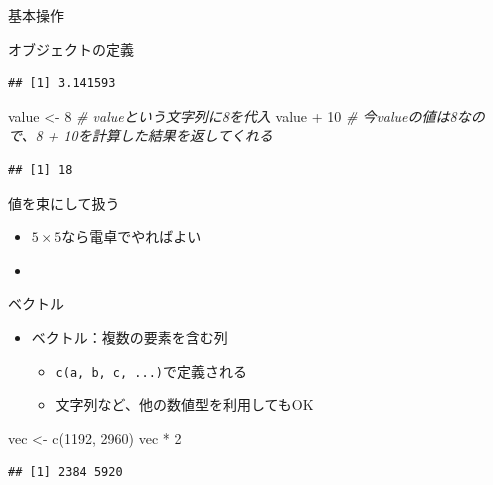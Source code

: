 \documentclass[
  ignorenonframetext,
]{beamer}
\newenvironment{Shaded}{\begin{snugshade}}{\end{snugshade}}
\newcommand{\CommentTok}[1]{\textcolor[rgb]{0.56,0.35,0.01}{\textit{#1}}}
\newcommand{\DecValTok}[1]{\textcolor[rgb]{0.00,0.00,0.81}{#1}}
\newcommand{\FunctionTok}[1]{\textcolor[rgb]{0.00,0.00,0.00}{#1}}
\newcommand{\NormalTok}[1]{#1}
\newcommand{\OtherTok}[1]{\textcolor[rgb]{0.56,0.35,0.01}{#1}}
\newcommand{\SpecialCharTok}[1]{\textcolor[rgb]{0.00,0.00,0.00}{#1}}
\providecommand{\tightlist}{%
  \setlength{\itemsep}{0pt}\setlength{\parskip}{0pt}}
\begin{document}
\begin{frame}[fragile]{基本操作}
\begin{block}{オブジェクトの定義}
\begin{verbatim}
## [1] 3.141593
\end{verbatim}

\begin{Shaded}
\begin{Highlighting}[]
\NormalTok{value }\OtherTok{\textless{}{-}} \DecValTok{8} \CommentTok{\# valueという文字列に8を代入}
\NormalTok{value }\SpecialCharTok{+} \DecValTok{10} \CommentTok{\# 今valueの値は8なので、8 + 10を計算した結果を返してくれる}
\end{Highlighting}
\end{Shaded}

\begin{verbatim}
## [1] 18
\end{verbatim}
\end{block}

\begin{block}{値を束にして扱う}
\protect\hypertarget{ux5024ux3092ux675fux306bux3057ux3066ux6271ux3046}{}
\begin{itemize}
\tightlist
\item
  \(5 \times 5\)なら電卓でやればよい
\item
\end{itemize}
\end{block}

\begin{block}{ベクトル}
\protect\hypertarget{ux30d9ux30afux30c8ux30eb}{}
\begin{itemize}
\tightlist
\item
  ベクトル：複数の要素を含む列

  \begin{itemize}
  \tightlist
  \item
    \texttt{c(a,\ b,\ c,\ ...)}で定義される
  \item
    文字列など、他の数値型を利用してもOK
  \end{itemize}
\end{itemize}

\begin{Shaded}
\begin{Highlighting}[]
\NormalTok{vec }\OtherTok{\textless{}{-}} \FunctionTok{c}\NormalTok{(}\DecValTok{1192}\NormalTok{, }\DecValTok{2960}\NormalTok{)}
\NormalTok{vec }\SpecialCharTok{*} \DecValTok{2}
\end{Highlighting}
\end{Shaded}

\begin{verbatim}
## [1] 2384 5920
\end{verbatim}


\end{block}
\end{frame}
\end{document}
